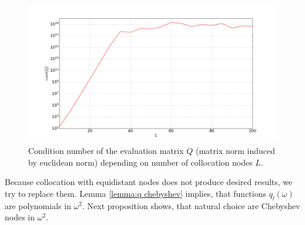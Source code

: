 \documentclass[a4paper,11pt,bibliography=totoc,listof=totoc,headinclude=true,cleardoublepage=empty,oneside]{scrbook}
\begin{document}
\begin{figure}
    \centering
    \includegraphics[width=1\linewidth]{latex//images//equi_coll/Figure_2.png}
    \caption{Condition number of the evaluation matrix $Q$ (matrix norm induced by euclidean norm) depending on number of collocation nodes $L$.}
    \label{fig:eq coll cond}
\end{figure}

Because collocation with equidistant nodes does not produce desired results, we try to replace them. Lemma \ref{lemma:q chebyshev} implies, that functions $q_l(\omega)$ are polynomials in $\omega^2$. Next proposition shows, that natural choice are Chebyshev nodes in $\omega^2$.
\end{document}
